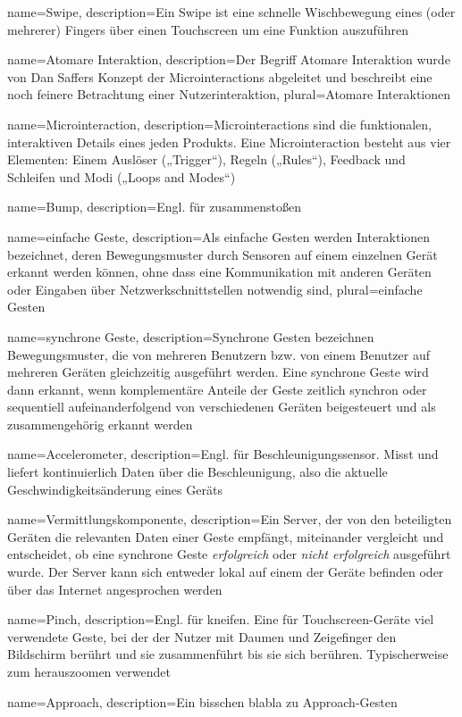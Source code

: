 {
    name=Swipe,
    description={Ein Swipe ist eine schnelle Wischbewegung eines (oder mehrerer) Fingers über einen Touchscreen um eine Funktion auszuführen}
}

{
    name=Atomare Interaktion,
    description={Der Begriff Atomare Interaktion wurde von Dan Saffers Konzept der Microinteractions abgeleitet und beschreibt eine noch feinere Betrachtung einer Nutzerinteraktion},
    plural={Atomare Interaktionen}
}

{
    name=Microinteraction,
    description={Microinteractions sind die funktionalen, interaktiven Details eines jeden Produkts. Eine Microinteraction besteht aus vier Elementen: Einem Auslöser („Trigger“), Regeln („Rules“), Feedback und Schleifen und Modi („Loops and Modes“)}
}

{
	name=Bump,
	description={Engl. für zusammenstoßen}
}

{
	name=einfache Geste,
	description={Als einfache Gesten werden Interaktionen bezeichnet, deren Bewegungsmuster durch Sensoren auf einem einzelnen Gerät erkannt werden können, ohne dass eine Kommunikation mit anderen Geräten oder Eingaben über Netzwerkschnittstellen notwendig sind},
	plural={einfache Gesten}
}

{
	name=synchrone Geste,
	description={Synchrone Gesten bezeichnen Bewegungsmuster, die von mehreren Benutzern bzw. von einem Benutzer auf mehreren Geräten gleichzeitig ausgeführt werden. Eine synchrone Geste wird dann erkannt, wenn komplementäre Anteile der Geste zeitlich synchron oder sequentiell aufeinanderfolgend von verschiedenen Geräten beigesteuert und als zusammengehörig erkannt werden \citep{Hinckley2003}}
}

{
	name=Accelerometer,
	description={Engl. für Beschleunigungssensor. Misst und liefert kontinuierlich Daten über die Beschleunigung, also die aktuelle Geschwindigkeitsänderung eines Geräts}
}

{
	name=Vermittlungskomponente,
	description={Ein Server, der von den beteiligten Geräten die relevanten Daten einer Geste empfängt, miteinander vergleicht und entscheidet, ob eine synchrone Geste \textit{erfolgreich} oder \textit{nicht erfolgreich} ausgeführt wurde. Der Server kann sich entweder lokal auf einem der Geräte befinden oder über das Internet angesprochen werden}
}

{
	name=Pinch,
	description={Engl. für kneifen. Eine für Touchscreen-Geräte viel verwendete Geste, bei der der Nutzer mit Daumen und Zeigefinger den Bildschirm berührt und sie zusammenführt bis sie sich berühren. Typischerweise zum herauszoomen verwendet}
}

{
	name=Approach,
	description={Ein bisschen blabla zu Approach-Gesten}
}